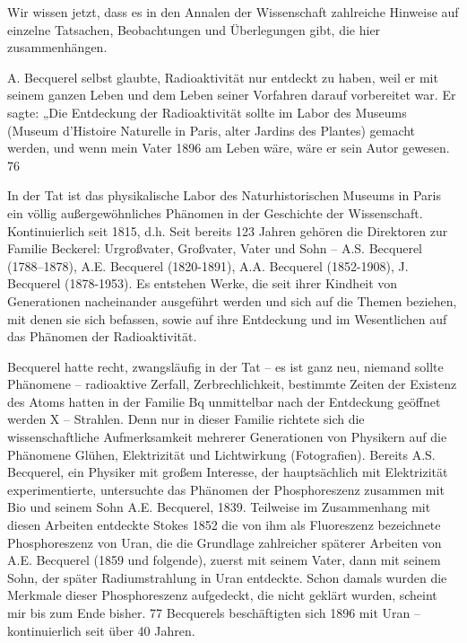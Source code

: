 \documentclass[11pt,a4paper]{book}
\begin{document}
Wir wissen jetzt, dass es in den Annalen der Wissenschaft zahlreiche Hinweise auf einzelne Tatsachen, Beobachtungen und Überlegungen gibt, die hier zusammenhängen.



A. Becquerel selbst glaubte, Radioaktivität nur entdeckt zu haben, weil er mit seinem ganzen Leben und dem Leben seiner Vorfahren darauf vorbereitet war. Er sagte: „Die Entdeckung der Radioaktivität sollte im Labor des Museums (Museum d'Histoire Naturelle in Paris, alter Jardins des Plantes) gemacht werden, und wenn mein Vater 1896 am Leben wäre, wäre er sein Autor gewesen. 76



In der Tat ist das physikalische Labor des Naturhistorischen Museums in Paris ein völlig außergewöhnliches Phänomen in der Geschichte der Wissenschaft. Kontinuierlich seit 1815, d.h. Seit bereits 123 Jahren gehören die Direktoren zur Familie Beckerel: Urgroßvater, Großvater, Vater und Sohn -- A.S. Becquerel (1788–1878), A.E. Becquerel (1820-1891), A.A. Becquerel (1852-1908), J. Becquerel (1878-1953). Es entstehen Werke, die seit ihrer Kindheit von Generationen nacheinander ausgeführt werden und sich auf die Themen beziehen, mit denen sie sich befassen, sowie auf ihre Entdeckung und im Wesentlichen auf das Phänomen der Radioaktivität.



Becquerel hatte recht, zwangsläufig in der Tat -- es ist ganz neu, niemand sollte Phänomene -- radioaktive Zerfall, Zerbrechlichkeit, bestimmte Zeiten der Existenz des Atoms hatten in der Familie Bq unmittelbar nach der Entdeckung geöffnet werden X -- Strahlen. Denn nur in dieser Familie richtete sich die wissenschaftliche Aufmerksamkeit mehrerer Generationen von Physikern auf die Phänomene Glühen, Elektrizität und Lichtwirkung (Fotografien). Bereits A.S. Becquerel, ein Physiker mit großem Interesse, der hauptsächlich mit Elektrizität experimentierte, untersuchte das Phänomen der Phosphoreszenz zusammen mit Bio und seinem Sohn A.E. Becquerel, 1839. Teilweise im Zusammenhang mit diesen Arbeiten entdeckte Stokes 1852 die von ihm als Fluoreszenz bezeichnete Phosphoreszenz von Uran, die die Grundlage zahlreicher späterer Arbeiten von A.E. Becquerel (1859 und folgende), zuerst mit seinem Vater, dann mit seinem Sohn, der später Radiumstrahlung in Uran entdeckte. Schon damals wurden die Merkmale dieser Phosphoreszenz aufgedeckt, die nicht geklärt wurden, scheint mir bis zum Ende bisher. 77 Becquerels beschäftigten sich 1896 mit Uran -- kontinuierlich seit über 40 Jahren.
\end{document}
